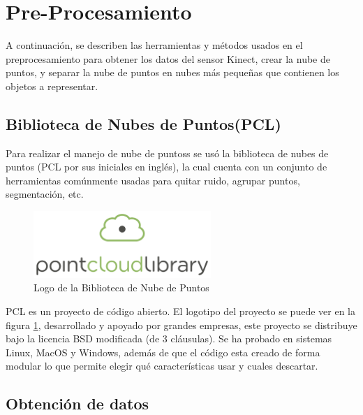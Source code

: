 \section{Pre-Procesamiento}

    A continuación, se describen las herramientas y métodos usados en el preprocesamiento para obtener los datos del sensor Kinect, crear la nube de puntos,  y separar la nube de puntos en nubes más pequeñas que contienen los objetos a representar.
   
    
    \subsection{Biblioteca de Nubes de Puntos(PCL)}
    
    	
        Para realizar el manejo de \glspl{nube de puntos} se usó la biblioteca de nubes de puntos (PCL por sus iniciales en inglés)\cite{Rusu_ICRA2011_PCL}, la cual cuenta con un conjunto de herramientas comúnmente usadas para quitar ruido, agrupar puntos, segmentación, etc.\\
        
        \begin{figure}[!htb] 
            \centering
            \includegraphics[width=0.6\textwidth]{02Desarrollo/Preprocesamiento/imagenes/pointcloudlibrary_vert_large_pos.png}
            \caption{Logo de la Biblioteca de Nube de Puntos} 
            \label{fig:PCL}
        \end{figure}
        
        PCL es un proyecto de código abierto. El logotipo del proyecto se puede ver en la figura \ref{fig:PCL}, desarrollado y apoyado por grandes empresas, este proyecto se distribuye bajo la licencia BSD modificada (de 3 cláusulas). Se ha probado en sistemas Linux, MacOS y Windows, además de que el código esta creado de forma modular lo que permite elegir qué características usar y cuales descartar.\\
        
        
    \subsection{Obtención de datos}
    
